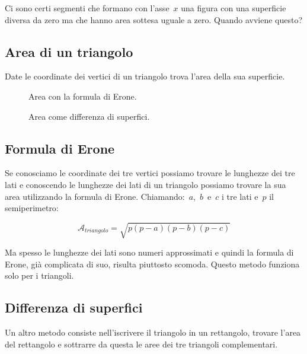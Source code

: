 Ci sono certi segmenti che formano con l'asse~\(x\) una figura con una 
superficie diversa da zero ma che hanno area sottesa uguale a zero.
Quando avviene questo?

\newpage

\subsection{Area di un triangolo}

Date le coordinate dei vertici di un triangolo trova l'area della sua 
superficie.

\begin{inaccessibleblock}
 \begin{figure}[h]
 \centering
 \begin{minipage}[t]{.45\textwidth}
  \centering \triangoloerone
  \caption{Area con la formula di Erone.}\label{fig:triangoloerone}
 \end{minipage}\hfil
 \begin{minipage}[t]{.45\textwidth}
  \centering \triangolodifferenza
  \caption{Area come differenza di superfici.}\label{fig:triangolodifferenza}
 \end{minipage}\hfil
\end{figure}
\end{inaccessibleblock}

\subsection*{Formula di Erone}
Se conosciamo le coordinate dei tre vertici possiamo trovare le lunghezze dei 
tre lati e conoscendo le lunghezze dei lati di un triangolo possiamo trovare
la sua area utilizzando la formula di Erone. Chiamando:~\(a\),~\(b\)~e~\(c\) 
i tre lati e~\(p\) il semiperimetro:

\[\mathcal{A}_{triangolo} = \sqrt{p(p-a)(p-b)(p-c)}\]

Ma spesso le lunghezze dei lati sono numeri approssimati e quindi la formula
di Erone, già complicata di suo, risulta piuttosto scomoda.
Questo metodo funziona solo per i triangoli.

\subsection*{Differenza di superfici}
Un altro metodo consiste nell'iscrivere il triangolo in un rettangolo, 
trovare l'area del rettangolo e sottrarre da questa le aree dei tre triangoli 
complementari.

